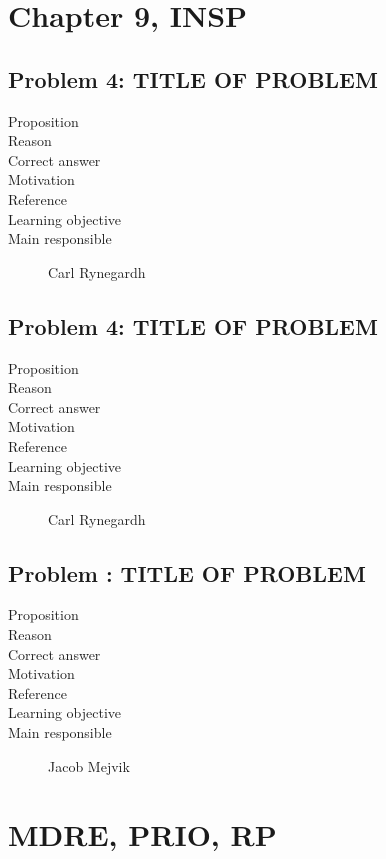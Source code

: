 \documentclass[10pt,a4paper]{article}
\begin{document}
\section*{Chapter 9, INSP}
\subsection*{Problem 4: TITLE OF PROBLEM}
\begin{description}
\item[Proposition] 
\item[Reason] 
\item[Correct answer]
\item[Motivation]
\item[Reference]
\item[Learning objective]
\item[Main responsible] Carl Rynegardh
\end{description}

\subsection*{Problem 4: TITLE OF PROBLEM}
\begin{description}
\item[Proposition] 
\item[Reason] 
\item[Correct answer]
\item[Motivation]
\item[Reference]
\item[Learning objective]
\item[Main responsible] Carl Rynegardh
\end{description}

\subsection*{Problem : TITLE OF PROBLEM}
\begin{description}
\item[Proposition] 
\item[Reason] 
\item[Correct answer]
\item[Motivation]
\item[Reference]
\item[Learning objective]
\item[Main responsible] Jacob Mejvik
\end{description}

\section*{MDRE, PRIO, RP}
\end{document}
